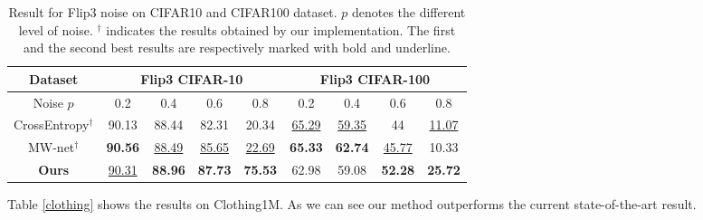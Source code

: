 \documentclass[runningheads]{llncs}
\begin{document}
	\begin{table}[!t]
		\caption{\label{flip3} Result for Flip3 noise on CIFAR10 and CIFAR100 dataset. $p$ denotes the different level of noise. $^\dagger$ indicates the results obtained by our implementation. The first and the second best results are respectively marked with bold and underline.}
		\centering
		\begin{tabular}{c|c|c|c|c||c|c|c|c}
			\hline
			Dataset  & \multicolumn{4}{c||}{Flip3 CIFAR-10} & \multicolumn{4}{c}{Flip3 CIFAR-100} \\ \hline
			Noise $p$    & 0.2        & 0.4       & 0.6       & 0.8       & 0.2        & 0.4        & 0.6       & 0.8       \\ \hline
			CrossEntropy$^\dagger$  & 90.13      & 88.44     & 82.31    & 20.34 & \underline{65.29}      & \underline{59.35}      & 44      & \underline{11.07}  \\
			MW-net$^\dagger$ \cite{shu2019meta}   & \textbf{90.56}      & \underline{88.49}     & \underline{85.65}  &\underline{22.69}   & \textbf{65.33}      & \textbf{62.74}      & \underline{45.77}  &10.33   \\ \hline
			\textbf{Ours}     & \underline{90.31}      & \textbf{88.96}     & \textbf{87.73}    & \textbf{75.53} & 62.98      & 59.08      & \textbf{52.28}   &\textbf{25.72}  \\ \hline
		\end{tabular}
	\end{table}
	
	
	Table \ref{clothing} shows the results on Clothing1M. As we can see our method outperforms the current state-of-the-art result.
	
\end{document}
